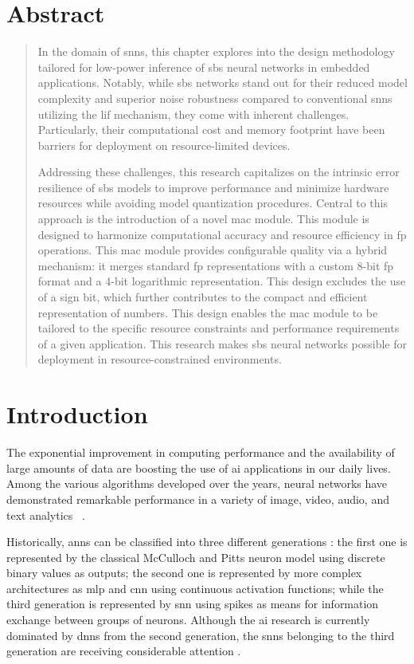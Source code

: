 \section*{Abstract}
\begin{quote}
In the domain of \glspl{snn}, this chapter explores into the design methodology tailored for low-power inference of \gls{sbs} neural networks in embedded applications. Notably, while \gls{sbs} networks stand out for their reduced model complexity and superior noise robustness compared to conventional \glspl{snn} utilizing the \gls{lif} mechanism, they come with inherent challenges. Particularly, their computational cost and memory footprint have been barriers for deployment on resource-limited devices.

Addressing these challenges, this research capitalizes on the intrinsic error resilience of \gls{sbs} models to improve performance and minimize hardware resources while avoiding model quantization procedures. Central to this approach is the introduction of a novel \gls{mac} module. This module is designed to harmonize computational accuracy and resource efficiency in \gls{fp} operations. This \gls{mac} module provides configurable quality via a hybrid mechanism: it merges standard \gls{fp} representations with a custom 8-bit \gls{fp} format and a 4-bit logarithmic representation. This design excludes the use of a sign bit, which further contributes to the compact and efficient representation of numbers. This design enables the \gls{mac} module to be tailored to the specific resource constraints and performance requirements of a given application. This research makes \gls{sbs} neural networks possible for deployment in resource-constrained environments.
\end{quote}
\section{Introduction}
\label{sec:introduction}
The exponential improvement in computing performance and the availability of large amounts of data are boosting the use of \gls{ai} applications in our daily lives. Among the various algorithms developed over the years, neural networks have demonstrated remarkable performance in a variety of image, video, audio, and text analytics ~\cite{schmidhuber2015deep,Taigman_2014_CVPR}. 

Historically, \glspl{ann} can be classified into three different generations \cite{Design_Exploration_SbS_Trans20}: the first one is represented by the classical McCulloch and Pitts neuron model using discrete binary values as outputs; the second one is represented by more complex architectures as \gls{mlp} and \gls{cnn} using continuous activation functions; while the third generation is represented by \gls{snn} using spikes as means for information exchange between groups of neurons. Although the \gls{ai} research is currently dominated by \glspl{dnn} from the second generation, the \glspl{snn} belonging to the third generation are receiving considerable attention \cite{Spinnaker_Trans13,ernst2007efficient,Design_Exploration_SbS_Trans20, SNN_Survey_Trans19}.

